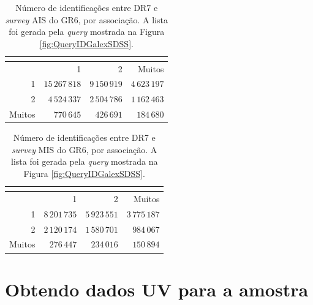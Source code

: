 \begin{table}
	\caption[Identificações entre \SDSS DR7 e {\em survey} AIS do \galex GR6.]
	{Número de identificações entre \SDSS DR7 e {\em survey} AIS do \galex GR6, por
	associação. A lista foi gerada pela {\em query} mostrada na Figura
	\ref{fig:QueryIDGalexSDSS}.}
	\setlength{\tabcolsep}{1cm}
	\begin{tabular}{r r r r}
		\galex &          \multicolumn{3}{c}{\SDSS} \\
		\midrule
		       &              1 &             2 &        Muitos \\
		1      & $15\,267\,818$ & $9\,150\,919$ & $4\,623\,197$ \\
		2      &  $4\,524\,337$ & $2\,504\,786$ & $1\,162\,463$ \\
		Muitos &     $770\,645$ &    $426\,691$ &    $184\,680$ \\
	\end{tabular}
	\label{tab:SDSSxGalexMatchesAIS}
\end{table}

\begin{table}
	\caption[Identificações entre \SDSS DR7 e {\em survey} AIS do \galex GR6.]
	{Número de identificações entre \SDSS DR7 e {\em survey} MIS do \galex GR6, por
	associação. A lista foi gerada pela {\em query} mostrada na Figura
	\ref{fig:QueryIDGalexSDSS}.}
	\setlength{\tabcolsep}{1cm}
	\begin{tabular}{r r r r}
		\galex &         \multicolumn{3}{c}{\SDSS} \\
		\midrule
		       &             1 &             2 &        Muitos \\
		1      & $8\,201\,735$ & $5\,923\,551$ & $3\,775\,187$ \\
		2      & $2\,120\,174$ & $1\,580\,701$ &    $984\,067$ \\
		Muitos &    $276\,447$ &    $234\,016$ &    $150\,894$ \\
	\end{tabular}
	\label{tab:SDSSxGalexMatchesMIS}
\end{table}



\section{Obtendo dados UV para a amostra \STARLIGHT}
\label{sec:Crossmatch:DefAmostras}

